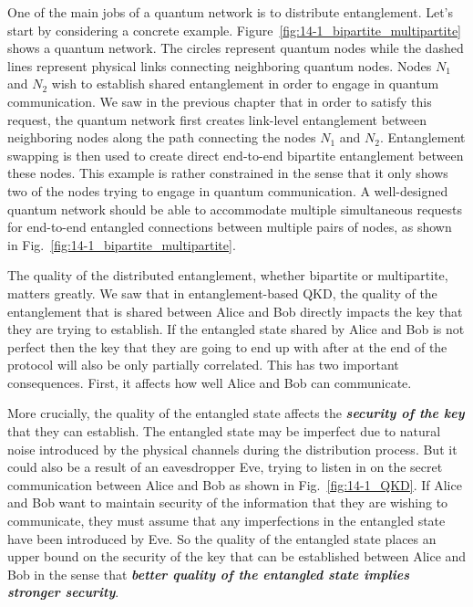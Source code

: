 One of the main jobs of a quantum network is to distribute entanglement.
Let's start by considering a concrete example.
Figure~\ref{fig:14-1_bipartite_multipartite} shows a quantum network.
The circles represent quantum nodes while the dashed lines represent physical links connecting neighboring quantum nodes.
Nodes $N_1$ and $N_2$ wish to establish shared entanglement in order to engage in quantum communication.
We saw in the previous chapter that in order to satisfy this request, the quantum network first creates link-level entanglement between neighboring nodes along the path connecting the nodes $N_1$ and $N_2$.
Entanglement swapping is then used to create direct end-to-end bipartite entanglement between these nodes.
This example is rather constrained in the sense that it only shows two of the nodes trying to engage in quantum communication.
A well-designed quantum network should be able to accommodate multiple simultaneous requests for end-to-end entangled connections between multiple pairs of nodes, as shown in Fig.~\ref{fig:14-1_bipartite_multipartite}. 

The quality of the distributed entanglement, whether bipartite or multipartite, matters greatly.
We saw that in entanglement-based QKD, the quality of the entanglement that is shared between Alice and Bob directly impacts the key that they are trying to establish.
If the entangled state shared by Alice and Bob is not perfect then the key that they are going to end up with after at the end of the protocol will also be only partially correlated.
This has two important consequences.
First, it affects how well Alice and Bob can communicate.

More crucially, the quality of the entangled state affects the \textit{\textbf{security of the key}} that they can establish.
The entangled state may be imperfect due to natural noise introduced by the physical channels during the distribution process.
But it could also be a result of an eavesdropper Eve, trying to listen in on the secret communication between Alice and Bob as shown in Fig.~\ref{fig:14-1_QKD}.
If Alice and Bob want to maintain security of the information that they are wishing to communicate, they must assume that any imperfections in the entangled state have been introduced by Eve.
So the quality of the entangled state places an upper bound on the security of the key that can be established between Alice and Bob in the sense that \textit{\textbf{better quality of the entangled state implies stronger security}}.

